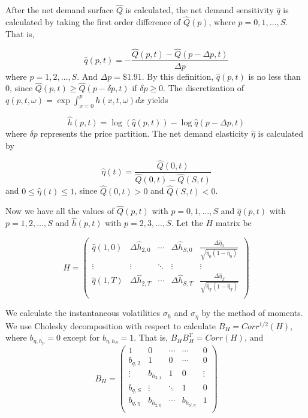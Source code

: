 \documentclass{article}
\begin{document}
After the net demand surface $\hat{Q}$ is calculated, the net demand sensitivity $\hat{q}$ is calculated by taking the first order difference of $\hat{Q}(p)$, where $p = 0,1,\ldots,S$. That is,

$$
\hat{q}(p,t) = - \frac{\hat{Q}(p, t) - \hat{Q}(p - \Delta p, t)}{\Delta p}
$$
where $p=1,2,\ldots,S$. And $\Delta p = \$1.91$. By this definition, $\hat{q}(p,t)$ is no less than 0, since $\hat{Q}(p, t) \geq \hat{Q}(p - \delta p, t)$ if $\delta p \geq 0$. The discretization of  $q(p,t,\omega ) =\exp{\int_{x=0}^{p}h(x,t,\omega )dx}$ yields

$$
\hat{h}(p,t) = \log(\hat{q}(p,t)) - \log{\hat{q}(p-\Delta p,t)}
$$
where $\delta p$ represents the price partition. The net demand elasticity $\hat{\eta}$ is calculated by

$$
\hat{\eta}(t) = \frac{\hat{Q}(0, t)}{\hat{Q}(0, t) - \hat{Q}(S, t)}
$$
and $0 \leq \hat{\eta}(t) \leq 1$, since $\hat{Q}(0, t) > 0$ and $\hat{Q}(S, t)<0$.

Now we have all the values of $\hat{Q}(p,t)$ with $p = 0,1,\ldots, S$ and $\hat{q}(p,t)$ with $p = 1,2,\ldots, S$ and $\hat{h}(p,t)$ with $p = 2,3,\ldots, S$. Let the $H$ matrix be

$$
H =
\left(
  \begin{array}{ccccc}
    \hat{q}(1,0) & \Delta \hat{h}_{2,0} & \cdots & \Delta \hat{h}_{S,0} & \frac{\Delta \hat{\eta}_{0}}{\sqrt{\hat{\eta}_{0}(1-\hat{\eta}_{0})}} \\
    \vdots & \vdots & \ddots & \vdots & \vdots \\
    \hat{q}(1,T) & \Delta \hat{h}_{2,T} & \cdots & \Delta \hat{h}_{S,T} & \frac{\Delta \hat{\eta}_{T}}{\sqrt{\hat{\eta}_{T}(1-\hat{\eta}_{T})}}  \\
  \end{array}
\right)
$$

We calculate the instantaneous volatilities $\sigma_h$ and $\sigma_{\eta}$ by the method of moments. We use Cholesky decomposition with respect to calculate $B_{H}=Corr^{1/2}(H)$, where $b_{\eta,h_p}=0$ except for $b_{\eta,h_S}=1$. That is, $B_H B_H^T = Corr(H)$, and
$$
B_H =
\left(
  \begin{array}{ccccc}
    1 & 0 & \cdots & \cdots & 0 \\
    b_{q,2} & 1 & 0 & \cdots & 0 \\
    \vdots & b_{h_{2,1}} & 1 & 0 & \vdots \\
    b_{q,S} & \vdots & \ddots & 1 & 0 \\
    b_{q,\eta} & b_{h_{2,\eta}} & \cdots & b_{h_{S,\eta}} & 1 \\
  \end{array}
\right)
$$
\end{document}
